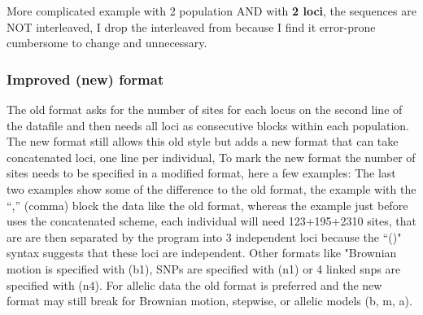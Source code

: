 More complicated example with 2 population AND with \textbf{2 loci}, the sequences are NOT interleaved, I drop the interleaved from because I find it error-prone cumbersome to change and unnecessary.
\begin{flushleft}
\begin{small}
\end{small}
\end{flushleft}
\subsubsection*{Improved (new) format}
The old format asks for the number of sites for each locus on the second line of the datafile and then needs all loci as consecutive blocks within each population. The new format still allows this old style but adds a new format that can take concatenated loci, one line per individual, To mark the new format the number of sites needs to be specified in a modified format, here a few examples:
The last two examples show some of the difference to the old format, the example with the ``,'' (comma) block the data like the old format, whereas the example just before uses the concatenated scheme, each individual will need 123+195+2310 sites, that are are then separated by the program into 3 independent loci because the ``()" syntax suggests that these loci are independent. Other formats like "Brownian motion is specified with (b1), SNPs are specified with (n1) or 4 linked snps are specified with (n4). For allelic data the old format is preferred and the new format may still break for Brownian motion, stepwise, or allelic models (b, m, a). 
